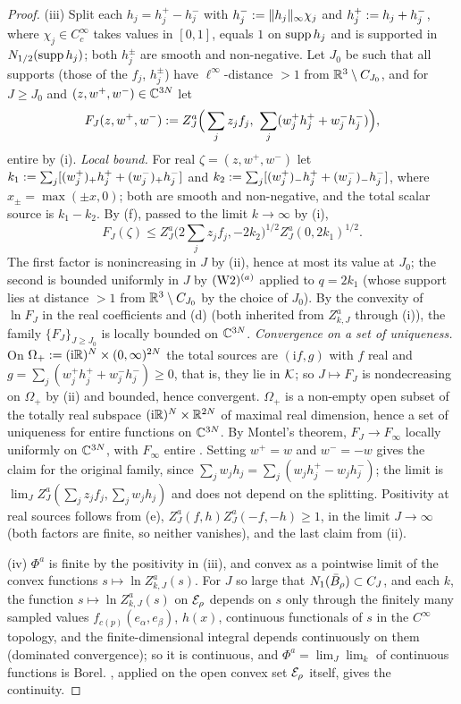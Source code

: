 \begin{proof}
(iii) Split each $h_j=h_j^+-h_j^-$ with $h_j^-:=\lVert h_j\rVert_\infty\chi_j$ and $h_j^+:= h_j+h_j^-$, where $\chi_j\in C^\infty_c$ takes values in $[0,1]$, equals $1$ on $\operatorname{supp} h_j$ and is supported in $N_{1/2}(\operatorname{supp} h_j)$; both $h_j^\pm$ are smooth and non-negative. Let $J_0$ be such that all supports (those of the $f_j$, $h_j^\pm$) have $\ell^\infty$-distance $>1$ from $\mathbb R^3\setminus C_{J_0}$, and for $J\ge J_0$ and $(z,w^+,w^-)\in\mathbb C^{3N}$ let
\[
F_J(z,w^+,w^-)\defeq Z^a_J\Big(\sum_jz_jf_j,\ \sum_j(w^+_jh^+_j+w^-_jh^-_j)\Big),
\]
entire by (i).
\emph{Local bound.} For real $\zeta=(z,w^+,w^-)$ let $k_1:=\sum_j[(w^+_j)_+h^+_j+(w^-_j)_+h^-_j]$ and $k_2:=\sum_j[(w^+_j)_-h^+_j+(w^-_j)_-h^-_j]$, where $x_\pm=\max(\pm x,0)$; both are smooth and non-negative, and the total scalar source is $k_1-k_2$. By (f), passed to the limit $k\to\infty$ by (i),
\[
F_J(\zeta)\le Z^a_J\Big(2\sum_jz_jf_j,-2k_2\Big)^{1/2}Z^a_J(0,2k_1)^{1/2}.
\]
The first factor is nonincreasing in $J$ by (ii), hence at most its value at $J_0$; the second is bounded uniformly in $J$ by $(\mathrm{W2})^{(a)}$ applied to $q=2k_1$ (whose support lies at distance $>1$ from $\mathbb R^3\setminus C_{J_0}$ by the choice of $J_0$). By the convexity of $\ln F_J$ in the real coefficients and (d) (both inherited from $Z^a_{k,J}$ through (i)), the family $\{F_J\}_{J\ge J_0}$ is locally bounded on $\mathbb C^{3N}$.
\emph{Convergence on a set of uniqueness.} On $\Omega_+:=(\mathrm i\mathbb R)^N\times(0,\infty)^{2N}$ the total sources are $(\mathrm if,g)$ with $f$ real and $g=\sum_j(w^+_jh^+_j+w^-_jh^-_j)\ge0$, that is, they lie in $\mathcal K$; so $J\mapsto F_J$ is nondecreasing on $\Omega_+$ by (ii) and bounded, hence convergent. $\Omega_+$ is a non-empty open subset of the totally real subspace $(\mathrm i\mathbb R)^N\times\mathbb R^{2N}$ of maximal real dimension, hence a set of uniqueness for entire functions on $\mathbb C^{3N}$. By Montel's theorem, $F_J\to F_\infty$ locally uniformly on $\mathbb C^{3N}$, with $F_\infty$ entire \cite{Hor90}. Setting $w^+=w$ and $w^-=-w$ gives the claim for the original family, since $\sum_jw_jh_j=\sum_j(w_jh^+_j-w_jh^-_j)$; the limit is $\lim_JZ^a_J(\sum_jz_jf_j,\sum_jw_jh_j)$ and does not depend on the splitting. Positivity at real sources follows from (e), $Z^a_J(f,h)Z^a_J(-f,-h)\ge1$, in the limit $J\to\infty$ (both factors are finite, so neither vanishes), and the last claim from (ii).

(iv) $\Phi^a$ is finite by the positivity in (iii), and convex as a pointwise limit of the convex functions $s\mapsto\ln Z^a_{k,J}(s)$. For $J$ so large that $N_{1}(\bar B_{\rho})\subset C_J$, and each $k$, the function $s\mapsto\ln Z^a_{k,J}(s)$ on $\mathcal E_\rho$ depends on $s$ only through the finitely many sampled values $f_{c(p)}(e_\alpha,e_\beta)$, $h(x)$, continuous functionals of $s$ in the $C^\infty$ topology, and the finite-dimensional integral depends continuously on them (dominated convergence); so it is continuous, and $\Phi^a=\lim_J\lim_k$ of continuous functions is Borel. , applied on the open convex set $\mathcal E_\rho$ itself, gives the continuity.


\end{proof}
